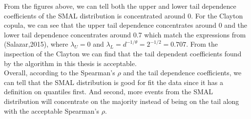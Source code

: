 \documentclass[mstat,12pt]{unswthesis}  %
\numberwithin{equation}{section}
\begin{document}
From the figures above, we can tell both the upper and lower tail dependence coefficients of the SMAL distribution is concentrated around 0. For the Clayton copula, we can see that the upper tail dependence concentrates around 0 and the lower tail dependence  concentrates around 0.7 which match the expressions from (Salazar,2015), where $\lambda_U = 0$ and $\lambda_L = d^{-1/\theta}=2^{-1/2} = 0.707$. From the inspection of the Clayton we can find that the tail dependent coefficients found by the algorithm in this thesis is acceptable.\\
Overall, according to the Spearman's $\rho$ and the tail dependence coefficients, we can tell that the SMAL distribution is good for fit the data since it has a definition on quantiles first. And second, more events from the SMAL distribution will concentrate on the majority instead of being on the tail along with the acceptable Spearman's $\rho$.

\end{document}
